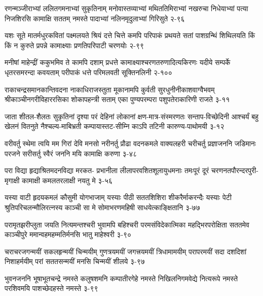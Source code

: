 
\annofourlineindentedshloka
{रणन्मञ्जीराभ्यां ललितगमनाभ्यां सुकृतिनाम्}
{मनोवास्तव्याभ्यां मथिततिमिराभ्यां नखरुचा}
{निधेयाभ्यां पत्या निजशिरसि कामाक्षि सततम्}
{नमस्ते पादाभ्यां नलिनमृदुलाभ्यां गिरिसुते}
{२-९६}

\annofourlineindentedshloka
{यशः सूते मातर्मधुरकवितां पक्ष्मलयते}
{श्रियं दत्ते चित्ते कमपि परिपाकं प्रथयते}
{सतां पाशग्रन्थिं शिथिलयति किं किं न कुरुते}
{प्रपन्ने कामाक्ष्याः प्रणतिपरिपाटी चरणयोः}
{२-९९}


\annofourlineindentedshloka
{मनीषां माहेन्द्रीं ककुभमिव ते कामपि दशाम्}
{प्रधत्ते कामाक्ष्याश्चरणतरुणादित्यकिरणः}
{यदीये सम्पर्के धृतरसमरन्दा कवयताम्}
{परीपाकं धत्ते परिमलवती सूक्तिनलिनी}
{२-१००}

\annofourlineindentedshloka
{राकाचन्द्रसमानकान्तिवदना नाकाधिराजस्तुता}
{मूकानामपि कुर्वती सुरधुनीनीकाशवाग्वैभवम्}
{श्रीकाञ्चीनगरीविहाररसिका शोकापहन्त्री सताम्}
{एका पुण्यपरम्परा पशुपतेराकारिणी राजते}
{३-११}

\annofourlineindentedshloka
{जाता शीतल-शैलतः सुकृतिनां दृश्या परं देहिनां}
{लोकानां क्षण-मात्र-संस्मरणतः सन्ताप-विच्छेदिनी}
{आश्चर्यं बहु खेलनं वितनुते नैश्चल्य-माबिभ्रती}
{कम्पायास्तट-सीम्नि काऽपि तटिनी कारुण्य-पाथोमयी}
{३-१२}


\annofourlineindentedshloka
{वरीवर्तु स्थेमा त्वयि मम गिरां देवि मनसो}
{नरीनर्तु प्रौढा वदनकमले वाक्यलहरी}
{चरीचर्तु प्रज्ञाजननि जडिमानः परजने}
{सरीसर्तु स्वैरं जननि मयि कामाक्षि करुणा}
{३-४८}


\annofourlineindentedshloka
{परा विद्या हृद्याश्रितमदनविद्या मरकत-}
{प्रभानीला लीलापरवशितशूलायुधमनाः}
{तमःपूरं दूरं चरणनतपौरन्दरपुरी-}
{मृगाक्षी कामाक्षी कमलतरलाक्षी नयतु मे}
{३-५६}

\annofourlineindentedshloka
{यस्या वाटी हृदयकमलं कौसुमी योगभाजाम्}
{यस्याः पीठी सततशिशिरा शीकरैर्माकरन्दैः}
{यस्याः पेटी श्रुतिपरिचलन्मौलिरत्नस्य काञ्ची}
{सा मे सोमाभरणमहिषी साधयेत्काङ्क्षितानि}
{३-७७}

\annofourlineindentedshloka
{परामृतझरीप्लुता जयति नित्यमन्तश्चरी}
{भुवामपि बहिश्चरी परमसंविदेकात्मिका}
{महद्भिरपरोक्षिता सततमेव काञ्चीपुरे}
{ममान्वहमहम्मतिर्मनसि भातु माहेश्वरी}
{३-९०}

\annofourlineindentedshloka
{चराचरजगन्मयीं सकलहृन्मयीं चिन्मयीम्}
{गुणत्रयमयीं जगत्त्रयमयीं त्रिधामामयीम्}
{परापरमयीं सदा दशदिशां निशाहर्मयीम्}
{परां सततसन्मयीं मनसि चिन्मयीं शीलये}
{३-९७}


\annofourlineindentedshloka
{भुवनजननि भूषाभूतचन्द्रे नमस्ते}
{कलुषशमनि कम्पातीरगेहे नमस्ते}
{निखिलनिगमवेद्ये नित्यरूपे नमस्ते}
{परशिवमयि पाशच्छेदहस्ते नमस्ते}
{३-९९}

